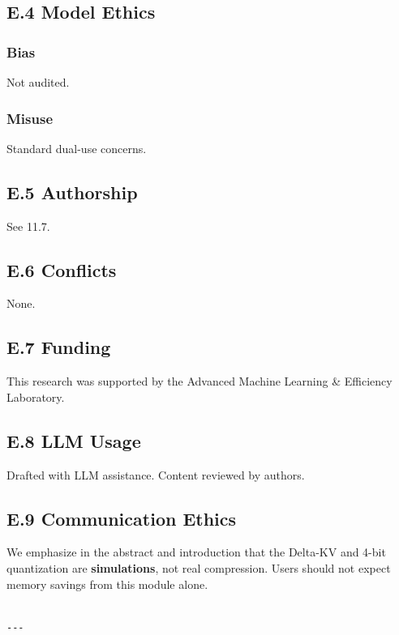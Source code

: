 \subsection{E.4 Model Ethics}

\subsubsection{Bias}
Not audited.

\subsubsection{Misuse}
Standard dual-use concerns.

\subsection{E.5 Authorship}

See  11.7.

\subsection{E.6 Conflicts}

None.

\subsection{E.7 Funding}

This research was supported by the Advanced Machine Learning \& Efficiency Laboratory.

\subsection{E.8 LLM Usage}

Drafted with LLM assistance. Content reviewed by authors.

\subsection{E.9 Communication Ethics}

We emphasize in the abstract and introduction that the Delta-KV and 4-bit 
quantization are \textbf{simulations}, not real compression. Users should not 
expect memory savings from this module alone.
\begin{lstlisting}

---
\end{lstlisting}